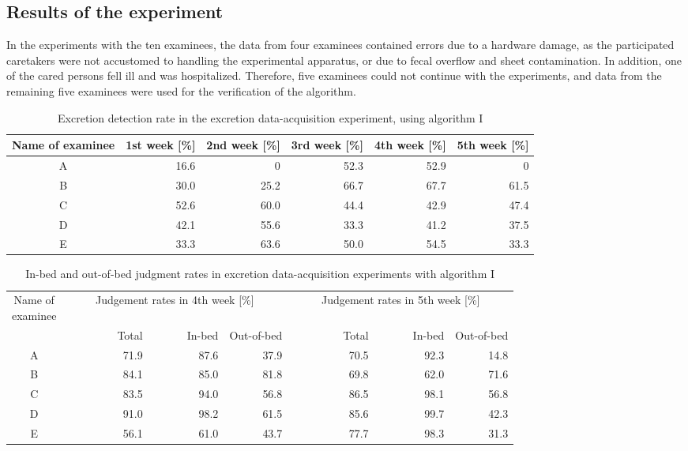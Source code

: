 \documentclass[publish,JRM,paper]{jaciiiarticle}
\begin{document}
\subsection{Results of the experiment}
In the experiments with the ten examinees, the data from four examinees contained errors due to a hardware damage, as the participated caretakers were not accustomed to handling the experimental apparatus, or due to fecal overflow and sheet contamination. In addition, one of the cared persons fell ill and was hospitalized. Therefore, five examinees could not continue with the experiments, and data from the remaining five examinees were used for the verification of the algorithm.

\begin{table}[t]
\begin{center}
\caption{Excretion detection rate in the excretion data-acquisition experiment, using algorithm I}
\begin{tabular}[t]{c|r|r|r|r|r}
\hline
  Name of examinee & 1st week [\%] & 2nd week [\%] & 3rd week [\%] & 4th week [\%] & 5th week [\%] \\
\cline{2-5}
\hline
A & 16.6 & 0 & 52.3 & 52.9 & 0 \\
\hline
B & 30.0 & 25.2 & 66.7 & 67.7 & 61.5 \\
\hline
C & 52.6 & 60.0 & 44.4 & 42.9 & 47.4 \\
\hline
D & 42.1 & 55.6 & 33.3 & 41.2 & 37.5 \\
\hline
E & 33.3 & 63.6 & 50.0 & 54.5 & 33.3  \\
\hline
\end{tabular}
\label{notification1}
\end{center}
\end{table}

\begin{table}[t]
\begin{center}
\caption{In-bed and out-of-bed judgment rates in excretion data-acquisition experiments with algorithm I}
\begin{tabular}[t]{c|rrr|rrr}
\hline
  \shortstack{Name of\\examinee} & \multicolumn{3}{c|}{Judgement rates in 4th week [\%]} & \multicolumn{3}{c}{Judgement rates in 5th week [\%]}\\
\cline{2-7}
  & \multicolumn{1}{p{15mm}|}{~~~~~~~~~Total} & \multicolumn{1}{p{15mm}|}{~~~~~~In-bed} & \multicolumn{1}{p{17mm}|}{Out-of-bed} & \multicolumn{1}{p{15mm}|}{~~~~~~~~~Total} & \multicolumn{1}{p{15mm}|}{~~~~~~In-bed} & \multicolumn{1}{p{17mm}}{Out-of-bed} \\
\hline
A & 71.9 & 87.6 & 37.9 & 70.5 & 92.3 & 14.8 \\
\hline
B & 84.1 & 85.0 & 81.8 & 69.8 & 62.0 & 71.6 \\
\hline
C & 83.5 & 94.0 & 56.8 & 86.5 & 98.1 & 56.8 \\
\hline
D & 91.0 & 98.2 & 61.5 & 85.6 & 99.7 & 42.3 \\
\hline
E & 56.1 & 61.0 & 43.7 & 77.7 & 98.3 & 31.3 \\
\hline
\end{tabular}
\label{inout_table}
\end{center}
\end{table}
\end{document}
